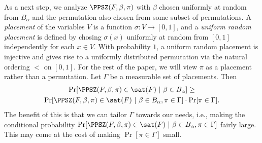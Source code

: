 As a next step, we analyze
$\PPSZ(F,\beta,\pi)$ with $\beta$ chosen uniformly at random from
$B_\alpha$ and the permutation also chosen from some subset of
permutations. A {\em placement} of the variables $V$ is a function
$\sigma: V \rightarrow [0,1]$, and a {\em uniform random placement} is defined
by chosing $\sigma(x)$ uniformly at random from $[0,1]$ independently
for each $x \in V$.  With probability $1$, a uniform random placement is
injective and gives rise to a uniformly distributed permutation via
the natural ordering $<$ on $[0,1]$. For the rest of the paper, we
will view $\pi$ as a placement rather than a permutation. Let $\Gamma$
be a measurable set of placements.  Then
\begin{multline*}
  \Pr[\PPSZ(F,\beta,\pi)\in\sat(F) \ | \ \beta \in B_\alpha] \geq  \\
  \Pr[\PPSZ(F,\beta,\pi)\in\sat(F) \ | \ \beta \in B_\alpha, \pi \in \Gamma] 
  \cdot \Pr[\pi \in \Gamma].
\end{multline*}
The benefit of this is that we can tailor $\Gamma$ towards our needs,
i.e., making the conditional probability $\Pr[\PPSZ(F,\beta,\pi) \in\sat(F) \ | \
\beta \in B_\alpha, \pi \in \Gamma]$ fairly large. This may come at
the cost of making $\Pr[\pi \in
\Gamma]$ small.\\

